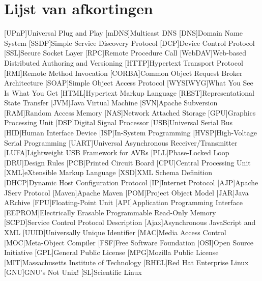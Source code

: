 %
%

\listoffigures


%
%

\lstlistoflistings


%
%

\chapter*{Lijst van afkortingen}

\begin{acronym}[WYSIWYG]	%

[UPnP]{Universal Plug and Play}
[mDNS]{Multicast DNS}
[DNS]{Domain Name System}
[SSDP]{Simple Service Discovery Protocol}
[DCP]{Device Control Protocol}
[SSL]{Secure Socket Layer}
[RPC]{Remote Procedure Call}
[WebDAV]{Web-based Distributed Authoring and Versioning}
[HTTP]{Hypertext Transport Protocol}
[RMI]{Remote Method Invocation}
[CORBA]{Common Object Request Broker Architecture}
[SOAP]{Simple Object Access Protocol}
[WYSIWYG]{What You See Is What You Get}
[HTML]{Hypertext Markup Language}
[REST]{Representational State Transfer}
[JVM]{Java Virtual Machine}
[SVN]{Apache Subversion}
[RAM]{Random Access Memory}
[NAS]{Network Attached Storage}
[GPU]{Graphics Processing Unit}
[DSP]{Digital Signal Processor}
[USB]{Universal Serial Bus}
[HID]{Human Interface Device}
[ISP]{In-System Programming}
[HVSP]{High-Voltage Serial Programming}
[UART]{Universal Asynchronous Receiver/Transmitter}
[LUFA]{Lightweight USB Framework for AVRs}
[PLL]{Phase-Locked Loop}
[DRU]{Design Rules}
[PCB]{Printed Circuit Board}
[CPU]{Central Processing Unit}
[XML]{eXtensible Markup Language}
[XSD]{XML Schema Definition}
[DHCP]{Dynamic Host Configuration Protocol}
[IP]{Internet Protocol}
[AJP]{Apache JServ Protocol}
[Maven]{Apache Maven}
[POM]{Project Object Model}
[JAR]{Java ARchive}
[FPU]{Floating-Point Unit}
[API]{Application Programming Interface}
[EEPROM]{Electrically Erasable Programmable Read-Only Memory}
[SCPD]{Service Control Protocol Description}
[Ajax]{Asynchronous JavaScript and XML}
[UUID]{Universally Unique Identifier}
[MAC]{Media Access Control}
[MOC]{Meta-Object Compiler}
[FSF]{Free Software Foundation}
[OSI]{Open Source Initiative}
[GPL]{General Public License}
[MPG]{Mozilla Public License}
[MIT]{Massachusetts Institute of Technology}
[RHEL]{Red Hat Enterprise Linux}
[GNU]{GNU's Not Unix!}
[SL]{Scientific Linux}
\end{acronym}
